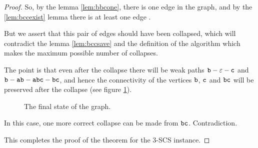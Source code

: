 \begin{proof}
So, by the lemma \ref{lem:bbcone}, there is one edge  in the graph, and by the \ref{lem:bccexist} lemma there is at least one edge .

But we assert that this pair of edges should have been collapsed, which will contradict the lemma \ref{lem:bccsave} and the definition of the algorithm which makes the maximum possible number of collapses.

The point is that even after the collapse there will be weak paths $ {\tt b} - \varepsilon - {\tt c} $ and $ {\tt b} - {\tt ab} - {\tt abc} - {\tt bc} $, and hence the connectivity of the vertices $ {\tt b} $, $ {\tt c} $ and $ {\tt bc} $ will be preserved after the collapse (see figure \ref{fig:lvl1final}).
\begin{figure}[ht]
\begin{center}

\end{center}

\caption{The final state of the graph.}\label{fig:lvl1final}
\end{figure}

In this case, one more correct collapse can be made from $ {\tt bc} $. Contradiction.

This completes the proof of the theorem for the $3$-SCS instance.
\end{proof}
